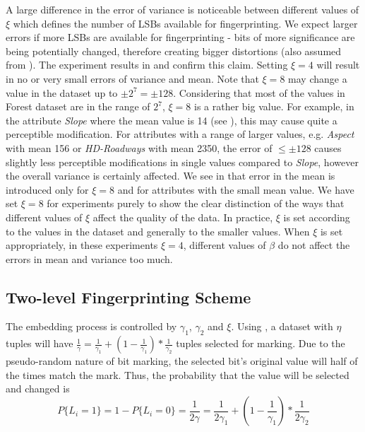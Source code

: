 A large difference in the error of variance is noticeable between different values of $\xi$ which defines the number of LSBs available for fingerprinting.
We expect larger errors if more LSBs are available for fingerprinting - bits of more significance are being potentially changed, therefore creating bigger distortions (also assumed from ).
The experiment results in  and  confirm this claim. 
Setting $\xi=4$ will result in no or very small errors of variance and mean.
Note that $\xi=8$ may change a value in the dataset up to $\pm 2^7=\pm 128$. 
Considering that most of the values in Forest dataset are in the range of $2^7$, $\xi=8$ is a rather big value. 
For example, in the attribute \textit{Slope} where the mean value is 14 (see ), this may cause quite a perceptible modification. 
For attributes with a range of larger values, e.g. \textit{Aspect} with mean 156 or \textit{HD-Roadways} with mean 2350, the error of $\leq \pm 128$ causes slightly less perceptible modifications in single values compared to \textit{Slope}, however the overall variance is certainly affected. 
We see in  that error in the mean is introduced only for $\xi=8$ and for attributes with the small mean value.
We have set $\xi=8$ for experiments purely to show the clear distinction of the ways that different values of $\xi$ affect the quality of the data. 
In practice, $\xi$ is set according to the values in the dataset and generally to the smaller values. When $\xi$ is set appropriately, in these experiments $\xi=4$, different values of $\beta$ do not affect the errors in mean and variance too much.

\subsection{Two-level Fingerprinting Scheme}

The embedding process is controlled by $\gamma_1$, $\gamma_2$ and $\xi$.
Using , a dataset with $\eta$ tuples will have $ \frac{1}{\gamma}=\frac{1}{\gamma_1}+(1-\frac{1}{\gamma_1})*\frac{1}{\gamma_2}$ tuples selected for marking. Due to the pseudo-random nature of bit marking, the selected bit's original value will half of the times match the mark. 
Thus, the probability that the value will be selected and changed is
\begin{equation}
    P\{L_i=1\} = 1- P\{L_i=0\}=\frac{1}{2\gamma} = \frac{1}{2\gamma_1} +(1-\frac{1}{\gamma_1})*\frac{1}{2\gamma_2}
\end{equation}

